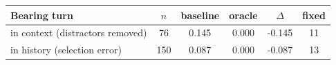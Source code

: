 \begin{tabular}{lccccc}
\toprule
Bearing turn & $n$ & baseline & oracle & $\Delta$ & fixed \\
\midrule
in context (distractors removed) & 76 & 0.145 & 0.000 & -0.145 & 11 \\
in history (selection error) & 150 & 0.087 & 0.000 & -0.087 & 13 \\
\bottomrule
\end{tabular}